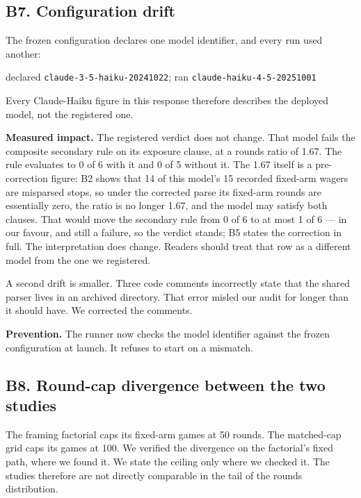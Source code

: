 \subsection*{B7. Configuration drift}

The frozen configuration declares one model identifier, and every run used another:

\begin{center}
\small declared \texttt{claude-3-5-haiku-20241022}; \; ran \texttt{claude-haiku-4-5-20251001}
\end{center}

\noindent
Every Claude-Haiku figure in this response therefore describes the deployed model, not the
registered one.

\textbf{Measured impact.} The registered verdict does not change. That model fails the composite
secondary rule on its exposure clause, at a rounds ratio of 1.67. The rule evaluates to 0 of 6
with it and 0 of 5 without it. The 1.67 itself is a pre-correction figure: B2 shows that 14 of
this model's 15 recorded fixed-arm wagers are misparsed stops, so under the corrected parse its
fixed-arm rounds are essentially zero, the ratio is no longer 1.67, and the model may satisfy
both clauses. That would move the secondary rule from 0 of 6 to at most 1 of 6 --- in our
favour, and still a failure, so the verdict stands; B5 states the correction in full. The
interpretation does change. Readers should treat that row as a different model from the one we
registered.

A second drift is smaller. Three code comments incorrectly state that the shared parser lives in
an archived directory. That error misled our audit for longer than it should have. We corrected
the comments.

\textbf{Prevention.} The runner now checks the model identifier against the frozen configuration
at launch. It refuses to start on a mismatch.


\subsection*{B8. Round-cap divergence between the two studies}

The framing factorial caps its fixed-arm games at 50 rounds. The matched-cap grid caps its games
at 100. We verified the divergence on the factorial's fixed path, where we found it. We state the
ceiling only where we checked it. The studies therefore are not directly comparable in the tail
of the rounds distribution.

